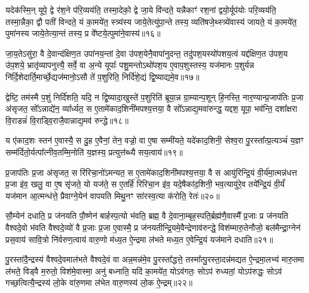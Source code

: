यदेक॑स्मि॒न् यूपे॒ द्वे र॑श॒ने प॑रि॒व्यय॑ति॒ तस्मा॒देको॒ द्वे जा॒ये वि॑न्दते॒ यन्नैकाꣳ॑ रश॒नां द्वयो॒र्यूप॑योः परि॒व्यय॑ति॒ तस्मा॒न्नैका॒ द्वौ पती॑ विन्दते॒ यं का॒मये॑त॒ स्त्र्य॑स्य जाये॒तेत्यु॑पा॒न्ते तस्य॒ व्यति॑षजे॒थ्स्त्र्ये॑वास्य॑ जायते॒ यं का॒मये॑त॒ पुमा॑नस्य जाये॒तेत्या॒न्तं तस्य॒ प्र वे᳚ष्टये॒त्पुमा॑ने॒वास्य॑॥१६॥

जा॒य॒ते\-ऽसु॑रा॒ वै दे॒वान्द॑क्षिण॒त उपा॑नय॒न्तां दे॒वा उ॑पश॒येनै॒वापा॑नुदन्त॒ तदु॑पश॒यस्यो॑पशय॒त्वं यद्द॑क्षिण॒त उ॑पश॒य उ॑प॒शये॒ भ्रातृ॑व्यापनुत्त्यै॒ सर्वे॒ वा अ॒न्ये यूपाः᳚ पशु॒मन्तो\-ऽथो॑पश॒य ए॒वाप॒शुस्तस्य॒ यज॑मानः प॒शुर्यन्न नि॑र्दि॒शेदार्ति॒\-मार्च्छे॒द्यज॑मानो॒\-ऽसौ ते॑ प॒शुरिति॒ निर्दि॑शे॒द्यं द्वि॒ष्याद्यमे॒व॥१७॥

द्वेष्टि॒ तम॑स्मै प॒शुं निर्दि॑शति॒ यदि॒ न द्वि॒ष्यादा॒खुस्ते॑ प॒शुरिति॑ ब्रूया॒न्न ग्रा॒म्यान्प॒शून् हि॒नस्ति॒ नार॒ण्यान्प्र॒जाप॑तिः प्र॒जा अ॑सृजत॒ सो᳚\-ऽन्नाद्ये॑न॒ व्या᳚र्ध्यत॒ स ए॒तामे॑काद॒शिनी॑मपश्य॒त्तया॒ वै सो᳚\-ऽन्नाद्य॒मवा॑रुन्द्ध॒ यद्दश॒ यूपा॒ भव॑न्ति॒ दशा᳚क्षरा वि॒राडन्नं॑ वि॒राड्वि॒राजै॒वान्नाद्य॒मव॑ रुन्द्धे॥१८॥

य ए॑काद॒शः स्तन॑ ए॒वास्यै॒ स दु॒ह ए॒वैनां॒ तेन॒ वज्रो॒ वा ए॒षा सम्मी॑यते॒ यदे॑काद॒शिनी॒ सेश्व॒रा पु॒रस्ता᳚त्प्र॒त्यञ्चं॑ य॒ज्ञꣳ सम्म॑र्दितो॒र्यत्पा᳚त्नीव॒तम्मि॒नोति॑ य॒ज्ञस्य॒ प्रत्युत्त॑ब्ध्यै सय॒त्वाय॑॥१९॥

{\anuvakamend[{वै सम॑ष्ट्यै॒ पुमा॑ने॒वास्य॒ यमे॒व रु॑न्धे त्रि॒ꣳ॒शच्च॑॥४॥}]}

प्र॒जाप॑तिः प्र॒जा अ॑सृजत॒ स रि॑रिचा॒नो॑\-ऽमन्यत॒ स ए॒तामे॑काद॒शिनी॑मपश्य॒त्तया॒ वै स आयु॑रिन्द्रि॒यं वी॒र्य॑मा॒त्मन्न॑धत्त प्र॒जा इ॑व॒ खलु॒ वा ए॒ष सृ॑जते॒ यो यज॑ते॒ स ए॒तर्\mbox{}हि॑ रिरिचा॒न इ॑व॒ यदे॒षैका॑द॒शिनी॒ भव॒त्यायु॑रे॒व तये᳚न्द्रि॒यं वी॒र्यं॑ यज॑मान आ॒त्मन्ध॑त्ते॒ प्रैवाग्ने॒येन॑ वापयति मिथु॒नꣳ सा॑रस्व॒त्या क॑रोति॒ रेतः॑॥२०॥

सौ॒म्येन॑ दधाति॒ प्र ज॑नयति पौ॒ष्णेन॑ बार्\mbox{}हस्प॒त्यो भ॑वति॒ ब्रह्म॒ वै दे॒वाना॒म्बृह॒स्पति॒र्ब्रह्म॑णै॒वास्मै᳚ प्र॒जाः प्र ज॑नयति वैश्वदे॒वो भ॑वति वैश्वदे॒व्यो॑ वै प्र॒जाः प्र॒जा ए॒वास्मै॒ प्र ज॑नयतीन्द्रि॒यमे॒वैन्द्रेणाव॑रुन्द्धे॒ विश॑म्मारु॒तेनौजो॒ बल॑मैन्द्रा॒ग्नेन॑ प्रस॒वाय॑ सावि॒त्रो नि॑र्वरुण॒त्वाय॑ वारु॒णो म॑ध्य॒त ऐ॒न्द्रमा ल॑भते मध्य॒त ए॒वेन्द्रि॒यं यज॑माने दधाति॥२१॥

पु॒रस्ता॑दै॒न्द्रस्य॑ वैश्वदे॒वमाल॑भते वैश्वदे॒वं वा अन्न॒मन्न॑मे॒व पु॒रस्ता᳚द्धत्ते॒ तस्मा᳚त्पु॒रस्ता॒दन्न॑मद्यत ऐ॒न्द्रमा॒लभ्य॑ मारु॒तमा ल॑भते॒ विड्वै म॒रुतो॒ विश॑मे॒वास्मा॒ अनु॑ बध्नाति॒ यदि॑ का॒मये॑त॒ यो\-ऽव॑गतः॒ सो\-ऽप॑ रुध्यतां॒ यो\-ऽप॑रुद्धः॒ सो\-ऽव॑ गच्छ॒त्वित्यै॒न्द्रस्य॑ लो॒के वा॑रु॒णमा ल॑भेत वारु॒णस्य॑ लो॒क ऐ॒न्द्रम्॥२२॥

